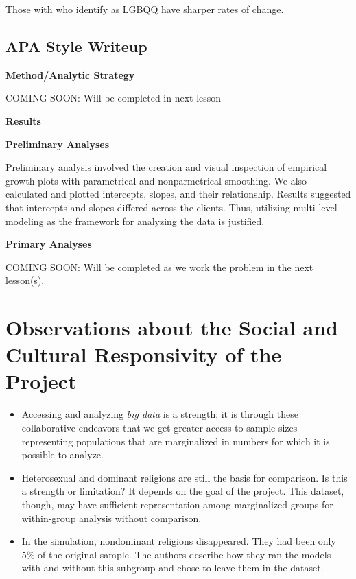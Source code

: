 \documentclass[
  english,
]{book}
\providecommand{\tightlist}{%
  \setlength{\itemsep}{0pt}\setlength{\parskip}{0pt}}
\begin{document}
Those with who identify as LGBQQ have sharper rates of change.

\hypertarget{apa-style-writeup-1}{%
\subsection{APA Style Writeup}\label{apa-style-writeup-1}}

\textbf{Method/Analytic Strategy}

COMING SOON: Will be completed in next lesson

\textbf{Results}

\textbf{Preliminary Analyses}

Preliminary analysis involved the creation and visual inspection of empirical growth plots with parametrical and nonparmetrical smoothing. We also calculated and plotted intercepts, slopes, and their relationship. Results suggested that intercepts and slopes differed across the clients. Thus, utilizing multi-level modeling as the framework for analyzing the data is justified.

\textbf{Primary Analyses}

COMING SOON: Will be completed as we work the problem in the next lesson(s).

\hypertarget{observations-about-the-social-and-cultural-responsivity-of-the-project}{%
\section{Observations about the Social and Cultural Responsivity of the Project}\label{observations-about-the-social-and-cultural-responsivity-of-the-project}}

\begin{itemize}
\tightlist
\item
  Accessing and analyzing \emph{big data} is a strength; it is through these collaborative endeavors that we get greater access to sample sizes representing populations that are marginalized in numbers for which it is possible to analyze.
\item
  Heterosexual and dominant religions are still the basis for comparison. Is this a strength or limitation? It depends on the goal of the project. This dataset, though, may have sufficient representation among marginalized groups for within-group analysis without comparison.
\item
  In the simulation, nondominant religions disappeared. They had been only 5\% of the original sample. The authors describe how they ran the models with and without this subgroup and chose to leave them in the dataset.
\end{itemize}
\end{document}
